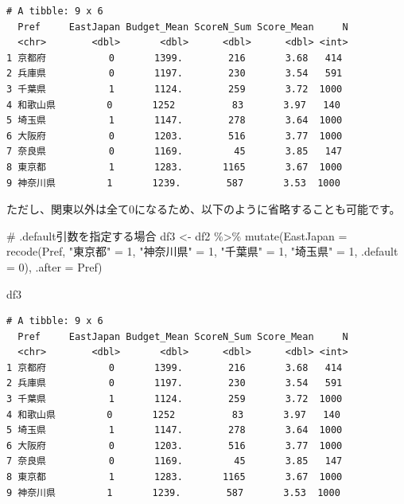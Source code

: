 \documentclass[
  a4paper,
  pandoc,
  ja=standard,
  jafont=haranoaji]{bxjsbook}
\newenvironment{Shaded}{\begin{snugshade}}{\end{snugshade}}
\newcommand{\AttributeTok}[1]{\textcolor[rgb]{0.00,0.48,0.65}{#1}}
\newcommand{\CommentTok}[1]{\textcolor[rgb]{0.37,0.37,0.37}{#1}}
\newcommand{\DecValTok}[1]{\textcolor[rgb]{0.68,0.00,0.00}{#1}}
\newcommand{\FunctionTok}[1]{\textcolor[rgb]{0.28,0.35,0.67}{#1}}
\newcommand{\NormalTok}[1]{\textcolor[rgb]{0.00,0.48,0.65}{#1}}
\newcommand{\OtherTok}[1]{\textcolor[rgb]{0.00,0.48,0.65}{#1}}
\newcommand{\SpecialCharTok}[1]{\textcolor[rgb]{0.37,0.37,0.37}{#1}}
\newcommand{\StringTok}[1]{\textcolor[rgb]{0.13,0.47,0.30}{#1}}
\begin{document}
\begin{verbatim}
# A tibble: 9 x 6
  Pref     EastJapan Budget_Mean ScoreN_Sum Score_Mean     N
  <chr>        <dbl>       <dbl>      <dbl>      <dbl> <int>
1 京都府           0       1399.        216       3.68   414
2 兵庫県           0       1197.        230       3.54   591
3 千葉県           1       1124.        259       3.72  1000
4 和歌山県         0       1252          83       3.97   140
5 埼玉県           1       1147.        278       3.64  1000
6 大阪府           0       1203.        516       3.77  1000
7 奈良県           0       1169.         45       3.85   147
8 東京都           1       1283.       1165       3.67  1000
9 神奈川県         1       1239.        587       3.53  1000
\end{verbatim}

ただし、関東以外は全て0になるため、以下のように省略することも可能です。

\begin{Shaded}
\begin{Highlighting}[numbers=left,,]
\CommentTok{\# .default引数を指定する場合}
\NormalTok{df3 }\OtherTok{\textless{}{-}}\NormalTok{ df2 }\SpecialCharTok{\%\textgreater{}\%} 
  \FunctionTok{mutate}\NormalTok{(}\AttributeTok{EastJapan =} \FunctionTok{recode}\NormalTok{(Pref,}
                            \StringTok{"東京都"}   \OtherTok{=} \DecValTok{1}\NormalTok{,}
                            \StringTok{"神奈川県"} \OtherTok{=} \DecValTok{1}\NormalTok{,}
                            \StringTok{"千葉県"}   \OtherTok{=} \DecValTok{1}\NormalTok{,}
                            \StringTok{"埼玉県"}   \OtherTok{=} \DecValTok{1}\NormalTok{,}
                            \AttributeTok{.default  =} \DecValTok{0}\NormalTok{),}
         \AttributeTok{.after =}\NormalTok{ Pref)}

\NormalTok{df3}
\end{Highlighting}
\end{Shaded}

\begin{verbatim}
# A tibble: 9 x 6
  Pref     EastJapan Budget_Mean ScoreN_Sum Score_Mean     N
  <chr>        <dbl>       <dbl>      <dbl>      <dbl> <int>
1 京都府           0       1399.        216       3.68   414
2 兵庫県           0       1197.        230       3.54   591
3 千葉県           1       1124.        259       3.72  1000
4 和歌山県         0       1252          83       3.97   140
5 埼玉県           1       1147.        278       3.64  1000
6 大阪府           0       1203.        516       3.77  1000
7 奈良県           0       1169.         45       3.85   147
8 東京都           1       1283.       1165       3.67  1000
9 神奈川県         1       1239.        587       3.53  1000
\end{verbatim}
\end{document}
